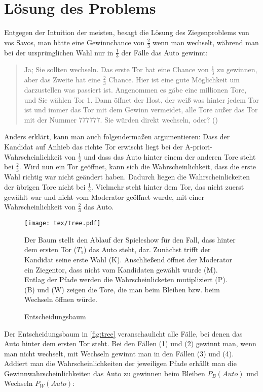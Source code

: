 \chapter{Lösung des Problems}

Entgegen der Intuition der meisten, besagt die Lösung des Ziegenproblems von vos Savos, man hätte eine Gewinnchance von $\frac{2}{3}$ wenn man wechselt, während man bei der ursprünglichen Wahl nur in $\frac{1}{3}$ der Fälle das Auto gewinnt:

\begin{quote}
    Ja; Sie sollten wechseln. Das erste Tor hat eine Chance von $\frac{1}{3}$ zu gewinnen, aber das Zweite hat eine $\frac{2}{3}$ Chance. Hier ist eine gute Möglichkeit um darzustellen was passiert ist. Angenommen es gäbe eine millionen Tore, und Sie wählen Tor 1. Dann öffnet der Host, der weiß was hinter jedem Tor ist und immer das Tor mit dem Gewinn vermeidet, alle Tore außer das Tor mit der Nummer 777777. Sie würden direkt wechseln, oder? (\cite{Savant:1990})
\end{quote}

Anders erklärt, kann man auch folgendermaßen argumentieren: Dass der Kandidat auf Anhieb das richte Tor erwischt liegt bei der A-priori-Wahrscheinlichkeit von $\frac{1}{3}$ und dass das Auto hinter einem der anderen Tore steht bei $\frac{2}{3}$. Wird nun ein Tor geöffnet, kann sich die Wahrscheinlichkeit, dass die erste Wahl richtig war nicht geändert haben. Dadurch liegen die Wahrscheinlickeiten der übrigen Tore nicht bei $\frac{1}{2}$. Vielmehr steht hinter dem Tor, das nicht zuerst gewählt war und nicht vom Moderator geöffnet wurde, mit einer Wahrscheinlichkeit von $\frac{2}{3}$ das Auto.

\begin{figure}[htbp]
    \centering
    \texttt{[image: tex/tree.pdf]}
    \caption{Entscheidungsbaum}\label{fig:tree}
    \small {Der Baum stellt den Ablauf der Spieleshow für den Fall, dass hinter dem ersten Tor ($T_1$) das Auto steht, dar. Zunächst trifft der Kandidat seine erste Wahl (K). Anschließend öffnet der Moderator ein Ziegentor, dass nicht vom Kandidaten gewählt wurde (M). Entlag der Pfade werden die Wahrscheinlicketen mutipliziert (P). (B) und (W) zeigen die Tore, die man beim Bleiben bzw. beim Wechseln öffnen würde.}
\end{figure}

Der Entscheidungsbaum in \autoref{fig:tree} veranschaulicht alle Fälle, bei denen das Auto hinter dem ersten Tor steht. Bei den Fällen (1) und (2) gewinnt man, wenn man nicht wechselt, mit Wechseln gewinnt man in den Fällen (3) und (4). Addiert man die Wahrscheinlichkeiten der jeweiligen Pfade erhällt man die Gewinnwahrscheinlichkeiten das Auto zu gewinnen beim Bleiben $P_B(Auto)$ und Wechseln $P_W(Auto)$:

